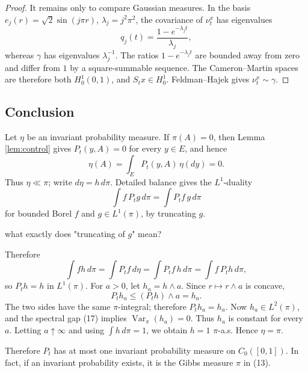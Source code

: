 \documentclass[12pt]{article}
\newcommand{\1}{\mathbf 1}
\newcommand{\Var}{\operatorname{Var}}
\newcommand{\review}[1]{\begin{reviewbox}#1\end{reviewbox}}
\begin{document}
\begin{proof}
It remains only to compare Gaussian measures.  In the basis
\(e_j(r)=\sqrt2\sin(j\pi r)\), \(\lambda_j=j^2\pi^2\), the covariance of
\(\nu_t^x\) has eigenvalues
\[
        q_j(t)=\frac{1-e^{-\lambda_jt}}{\lambda_j},
\]
whereas \(\gamma\) has eigenvalues \(\lambda_j^{-1}\).  The ratios
\(1-e^{-\lambda_jt}\) are bounded away from zero and differ from \(1\) by a
square-summable sequence.  The Cameron--Martin spaces are therefore both
\(H^1_0(0,1)\), and \(S_tx\in H^1_0\).  Feldman--Hajek gives
\(\nu_t^x\sim\gamma\).
\end{proof}

\subsection*{Conclusion}

Let \(\eta\) be an invariant probability measure.  If \(\pi(A)=0\), then
Lemma \ref{lem:control} gives \(P_t(y,A)=0\) for every \(y\in E\), and hence
\[
        \eta(A)=\int_E P_t(y,A)\,\eta(dy)=0.
\]
Thus \(\eta\ll\pi\); write \(d\eta=h\,d\pi\).  Detailed balance gives the
\(L^1\)-duality
\[
        \int f\,P_t g\,d\pi=\int P_t f\,g\,d\pi
\]
for bounded Borel \(f\) and \(g\in L^1(\pi)\), by truncating \(g\). \review{what exactly does "truncating of $g$" mean?}  Therefore
\[
 \int f h\,d\pi=\int P_tf\,d\eta
      =\int P_tf\,h\,d\pi=\int f\,P_t h\,d\pi ,
\]
so \(P_t h=h\) in \(L^1(\pi)\).  For \(a>0\), let \(h_a=h\wedge a\).  Since
\(r\mapsto r\wedge a\) is concave,
\[
        P_t h_a\le (P_t h)\wedge a=h_a .
\]
The two sides have the same \(\pi\)-integral; therefore \(P_t h_a=h_a\).
Now \(h_a\in L^2(\pi)\), and the spectral gap (17) implies
\(\Var_\pi(h_a)=0\).  Thus \(h_a\) is constant for every \(a\).  Letting
\(a\uparrow\infty\) and using \(\int h\,d\pi=1\), we obtain \(h=1\)
\(\pi\)-a.s.  Hence \(\eta=\pi\).

Therefore \(P_t\) has at most one invariant probability measure on
\(C_0([0,1])\).  In fact, if an invariant probability exists, it is the Gibbs
measure \(\pi\) in (13).
\end{document}
